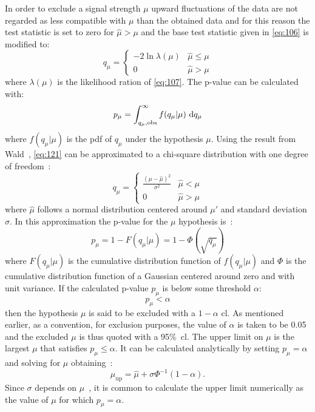 In order to exclude a signal strength $\mu$ upward fluctuations of the data are
not regarded as less compatible with $\mu$ than the obtained data and for this
reason the test statistic is set to zero for $\hat{\mu} > \mu$ and the base test
statistic given in \cref{eq:106} is modified to:
\begin{equation}
  \label{eq:121}
  q_\mu =
  \left\{
    \begin{array}{lr}
      - 2 \ln \lambda(\mu)  & \hat{\mu} \leq \mu \\
      0 & \hat{\mu} > \mu
    \end{array}
    \right.
\end{equation}
where $\lambda(\mu)$ is the likelihood ration of \cref{eq:107}. The p-value can
be calculated with:
\begin{equation}
  \label{eq:109}
  p_\mu = \int_{q_\mu, \mathrm{obs}}^\infty f(q_\mu | \mu)~\mathrm{d} q_\mu
\end{equation}
where $f(q_\mu | \mu)$ is the \gls{pdf} of $q_\mu$ under the hypothesis
$\mu$. Using the result from Wald~\cite{WaldApproximation}, \eqref{eq:121} can
be approximated to a chi-square distribution with one degree of
freedom~\cite{StatProcedure}:
\begin{equation}
  \label{eq:122}
  q_\mu =
  \left\{
    \begin{array}{lr}
      \frac{(\mu - \hat{\mu})^2}{\sigma^2}  & \hat{\mu} < \mu \\
      0 & \hat{\mu} > \mu
    \end{array}
    \right.
\end{equation}
where $\hat{\mu}$ follows a normal distribution centered around $\mu'$ and
standard deviation $\sigma$. In this approximation the p-value for the $\mu$
hypothesis is~\cite{StatProcedure}:
\begin{equation}
  \label{eq:123}
  p_\mu = 1 - F(q_\mu|\mu) = 1 - \Phi(\sqrt{q_\mu})
\end{equation}
where $F(q_\mu|\mu)$ is the cumulative distribution function of $f(q_\mu|\mu)$
and $\Phi$ is the cumulative distribution function of a Gaussian centered around
zero and with unit variance. If the calculated p-value $p_\mu$ is below some
threshold $\alpha$:
\begin{equation}
  \label{eq:124}
  p_\mu < \alpha
\end{equation}
then the hypothesis $\mu$ is said to be excluded with a $1 - \alpha$
\gls{cl}. As mentioned earlier, as a convention, for exclusion purposes, the
value of $\alpha$ is taken to be 0.05 and the excluded $\mu$ is thus quoted with
a 95\%~\gls{cl}. The upper limit on $\mu$ is the largest $\mu$ that satisfies
$p_\mu \leq \alpha$. It can be calculated analytically by setting $p_\mu =
\alpha$ and solving for $\mu$ obtaining~\cite{StatProcedure}:
\begin{equation}
  \label{eq:125}
  \mu_{\mathrm{up}} = \hat{\mu} + \sigma \Phi^{-1}(1 - \alpha).
\end{equation}
Since $\sigma$ depends on $\mu$~\cite{StatProcedure}, it is common to calculate
the upper limit numerically as the value of $\mu$ for which $p_\mu = \alpha$.
